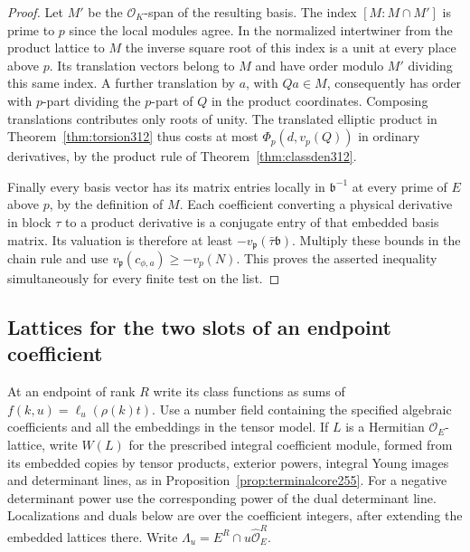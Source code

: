 \documentclass[a4paper,11pt]{article}
\theoremstyle{definition}
\theoremstyle{remark}
\numberwithin{equation}{section}
\newcommand{\OO}{\mathcal O}
\begin{document}
\begin{proof}
Let \(M'\) be the \(\OO_K\)-span of the resulting basis.
The index \([M:M\cap M']\) is prime to \(p\) since the local
modules agree. In the normalized intertwiner from the product
lattice to \(M\) the inverse square root of this index is a
unit at every place above \(p\). Its translation vectors belong
to \(M\) and have order modulo \(M'\) dividing this same index.
A further translation by \(a\), with \(Qa\in M\), consequently
has order with \(p\)-part dividing the \(p\)-part of \(Q\) in
the product coordinates. Composing translations contributes
only roots of unity. The translated elliptic product in
Theorem~\ref{thm:torsion312} thus costs at most
\(\Phi_p(d,v_p(Q))\) in ordinary derivatives, by the product
rule of Theorem~\ref{thm:classden312}.

Finally every basis vector has its matrix entries locally in
\(\mathfrak b^{-1}\) at every prime of \(E\) above \(p\), by
the definition of \(M\). Each coefficient converting a physical
derivative in block \(\tau\) to a product derivative is a conjugate
entry of that embedded basis matrix. Its valuation is therefore
at least \(-v_{\mathfrak p}(\bar\tau\mathfrak b)\). Multiply these
bounds in the chain rule and use \(v_{\mathfrak p}(c_{\phi,a})
\ge-v_p(N)\). This proves the asserted inequality simultaneously
for every finite test on the list.
\end{proof}

\subsection{Lattices for the two slots of an endpoint coefficient}\label{nav:VIII-63}
At an endpoint of rank \(R\) write its class functions as sums
of \(f(k,u)=\ell_u(\rho(k)t)\). Use a number field containing
the specified algebraic coefficients and all the embeddings
in the tensor model. If \(L\) is a Hermitian \(\OO_E\)-lattice,
write \(W(L)\) for the prescribed integral coefficient module,
formed from its embedded copies by tensor products, exterior
powers, integral Young images and determinant lines, as in
Proposition~\ref{prop:terminalcore255}. For a negative
determinant power use the corresponding power of the dual
determinant line. Localizations and duals below are over
the coefficient integers, after extending the embedded lattices
there. Write \(\Lambda_u=E^R\cap u\widehat{\OO}_E^R\).
\end{document}
